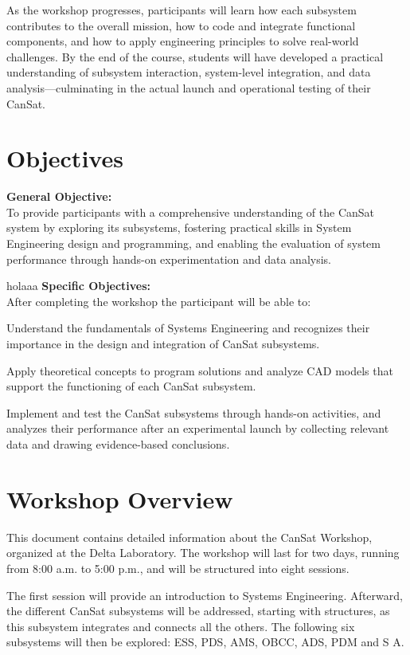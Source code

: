 \documentclass[a4paper,12pt]{article}
\begin{document}
As the workshop progresses, participants will learn how each subsystem contributes to the overall mission, how to code and integrate functional components, and how to apply engineering principles to solve real-world challenges. By the end of the course, students will have developed a practical understanding of subsystem interaction, system-level integration, and data analysis—culminating in the actual launch and operational testing of their CanSat.


\newpage

\section{Objectives}


\textbf{General Objective: }
\\
To provide participants with a comprehensive understanding of the CanSat system by exploring its subsystems, fostering practical skills in System Engineering design and programming, and enabling the evaluation of system performance through hands-on experimentation and data analysis.



holaaa
\textbf{Specific Objectives:}
\\
After completing the workshop the participant will be able to:

Understand the fundamentals of Systems Engineering and recognizes their importance in the design and integration of CanSat subsystems.

Apply theoretical concepts to program solutions and analyze CAD models that support the functioning of each CanSat subsystem.

Implement and test the CanSat subsystems through hands-on activities, and analyzes their performance after an experimental launch by collecting relevant data and drawing evidence-based conclusions.


\newpage

\section{Workshop Overview}

This document contains detailed information about the CanSat Workshop, organized at the Delta Laboratory. The workshop will last for two days, running from 8:00 a.m. to 5:00 p.m., and will be structured into eight sessions.

The first session will provide an introduction to Systems Engineering. Afterward, the different CanSat subsystems will be addressed, starting with structures, as this subsystem integrates and connects all the others. The following six subsystems will then be explored: ESS, PDS, AMS, OBCC, ADS, PDM and S A. 
\end{document}
